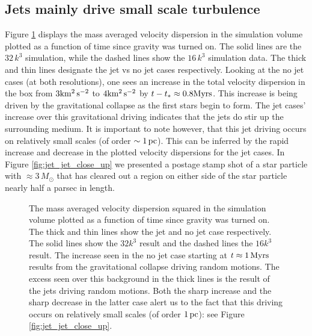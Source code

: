 \documentclass[../dissertation.tex]{subfiles}
\begin{document}
\subsection{Jets mainly drive small scale turbulence} \label{sec:jet_jets_drive_small}
Figure \ref{fig:jet_jet_driven_turb} displays the mass averaged velocity dispersion in the simulation volume plotted as a function of time since gravity was turned on.
The solid lines are the $32\, k^3$ simulation, while the dashed lines show the $16\, k^3$ simulation data.
The thick and thin lines designate the jet vs no jet cases respectively.
Looking at the no jet cases (at both resolutions), one sees an increase in the total velocity dispersion in the box from $3 {\rm km^2 \, s^{-2}}$ to $4 {\rm km^2 \, s^{-2}}$ by $t-t_* \approx 0.8 {\rm Myrs}$.
This increase is being driven by the gravitational collapse as the first stars begin to form.
The jet cases' increase over this gravitational driving indicates that the jets do stir up the surrounding medium.
It is important to note however, that this jet driving occurs on relatively small scales (of order $\sim 1 \, {\rm pc}$).
This can be inferred by the rapid increase and decrease in the plotted velocity dispersions for the jet cases.
In Figure \ref{fig:jet_jet_close_up} we presented a postage stamp shot of a star particle with $\approx 3 \, M_\odot$ that has cleared out a region on either side of the star particle nearly half a parsec in length.
%
\begin{figure}[htb] %
  \caption[Jet - $\vrms \lp t-t_{\rm grav} \rp$ ]{The mass averaged velocity dispersion squared in the simulation volume plotted as a function of time since gravity was turned on.
The thick and thin lines show the jet and no jet case respectively. The solid lines show the $32 k^3$ result and the dashed lines the $16k^3$ result.
The increase seen in the no jet case starting at $ t \approx 1 \, {\rm Myrs}$ results from the gravitational collapse driving random motions.
The excess seen over this background in the thick lines is the result of the jets driving random motions.
Both the sharp increase and the sharp decrease in the latter case alert us to the fact that this driving occurs on relatively small scales (of order $1\, {\rm pc} $): see Figure \ref{fig:jet_jet_close_up}.
}
    \label{fig:jet_jet_driven_turb}
\end{figure}
%
\end{document}
